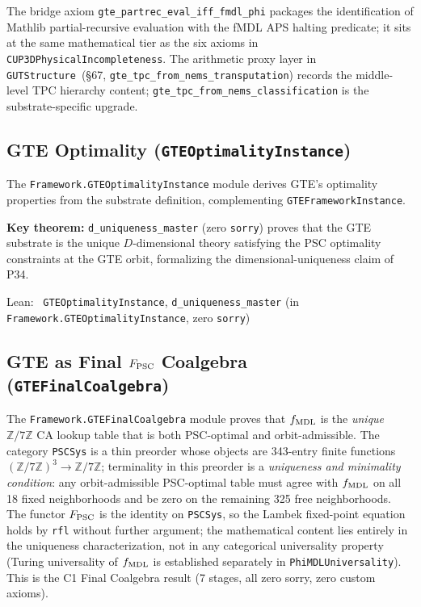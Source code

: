 \documentclass[11pt,a4paper]{article}
\newenvironment{leanref}%
  {\par\smallskip\noindent\begingroup\raggedright\textup{Lean:}~}%
  {\par\endgroup}
\theoremstyle{definition}
\begin{document}
The bridge axiom \lstinline|gte_partrec_eval_iff_fmdl_phi| packages the identification
of Mathlib partial-recursive evaluation with the fMDL APS halting predicate; it sits
at the same mathematical tier as the six axioms in
\texttt{CUP3DPhysicalIncompleteness}.
The arithmetic proxy layer in \texttt{GUTStructure}~(\S67,
\lstinline|gte_tpc_from_nems_transputation|) records the middle-level TPC hierarchy
content; \lstinline|gte_tpc_from_nems_classification| is the substrate-specific upgrade.

\subsection[GTE Optimality]{GTE Optimality (\texttt{GTEOptimalityInstance})}\label{subsec:gte-optimality-instance}

The \texttt{Framework.GTEOptimalityInstance} module derives GTE's optimality properties
from the substrate definition, complementing \texttt{GTEFrameworkInstance}.

\textbf{Key theorem:} \lstinline|d_uniqueness_master| (zero \texttt{sorry}) proves that
the GTE substrate is the unique $D$-dimensional theory satisfying the PSC optimality
constraints at the GTE orbit, formalizing the dimensional-uniqueness claim of P34.

\begin{leanref}
\lstinline|GTEOptimalityInstance|, \lstinline|d_uniqueness_master|
\textup{(in \texttt{Framework.GTEOptimalityInstance}, zero \texttt{sorry})}
\end{leanref}

\subsection{GTE as Final $F_{\rm PSC}$ Coalgebra (\texttt{GTEFinalCoalgebra})}\label{subsec:gte-final-coalgebra}

The \texttt{Framework.GTEFinalCoalgebra} module proves that $f_{\rm MDL}$ is the
\emph{unique} $\mathbb{Z}/7\mathbb{Z}$ CA lookup table that is both PSC-optimal and
orbit-admissible.  The category \texttt{PSCSys} is a thin preorder whose objects are
343-entry finite functions $(\mathbb{Z}/7\mathbb{Z})^3\to\mathbb{Z}/7\mathbb{Z}$;
terminality in this preorder is a \emph{uniqueness and minimality condition}: any
orbit-admissible PSC-optimal table must agree with $f_{\rm MDL}$ on all 18 fixed
neighborhoods and be zero on the remaining 325 free neighborhoods.  The functor
$F_{\rm PSC}$ is the identity on \texttt{PSCSys}, so the Lambek fixed-point equation
holds by \lstinline|rfl| without further argument; the mathematical content lies
entirely in the uniqueness characterization, not in any categorical universality
property (Turing universality of $f_{\rm MDL}$ is established separately in
\texttt{PhiMDLUniversality}).
This is the C1 Final Coalgebra result (7 stages, all zero sorry, zero custom axioms).
\end{document}
